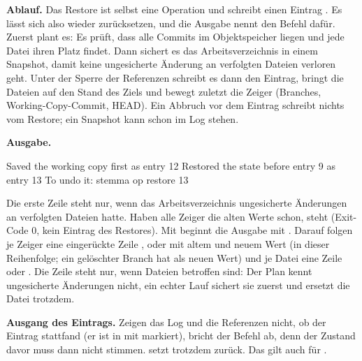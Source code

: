 {\bf Ablauf.} Das Restore ist selbst eine Operation und schreibt einen Eintrag
. Es lässt sich also wieder zurücksetzen, und die Ausgabe nennt den Befehl dafür.
Zuerst plant es: Es prüft, dass alle Commits im Objektspeicher liegen und jede Datei
ihren Platz findet.
Dann sichert es das Arbeitsverzeichnis in einem Snapshot, damit keine ungesicherte Änderung
an verfolgten Dateien verloren geht.
Unter der Sperre der Referenzen schreibt es dann den Eintrag, bringt die Dateien
auf den Stand des Ziels und bewegt zuletzt die Zeiger (Branches, Working-Copy-Commit, HEAD).
Ein Abbruch vor dem Eintrag schreibt nichts vom Restore; ein Snapshot kann schon im Log stehen.

{\bf Ausgabe.}

\starttyping
Saved the working copy first as entry 12
Restored the state before entry 9 as entry 13
To undo it: stemma op restore 13
\stoptyping

Die erste Zeile steht nur, wenn das Arbeitsverzeichnis ungesicherte Änderungen
an verfolgten Dateien hatte.
Haben alle Zeiger die alten Werte schon, steht
(Exit-Code 0, kein Eintrag des Restores).
Mit  beginnt die Ausgabe mit
.
Darauf folgen je Zeiger eine eingerückte Zeile ,  oder
 mit altem und neuem Wert (in dieser Reihenfolge; ein gelöschter Branch hat
\type{-} als neuen Wert) und je Datei eine Zeile  oder .
Die Zeile  steht nur, wenn Dateien betroffen sind:
Der Plan kennt ungesicherte Änderungen nicht, ein echter Lauf sichert sie zuerst
und ersetzt die Datei trotzdem.

{\bf Ausgang des Eintrags.} Zeigen das Log und die Referenzen nicht, ob der Eintrag
stattfand (er ist in  mit  markiert), bricht der Befehl ab, denn der
Zustand davor muss dann nicht stimmen.  setzt trotzdem zurück.
Das gilt auch für .

